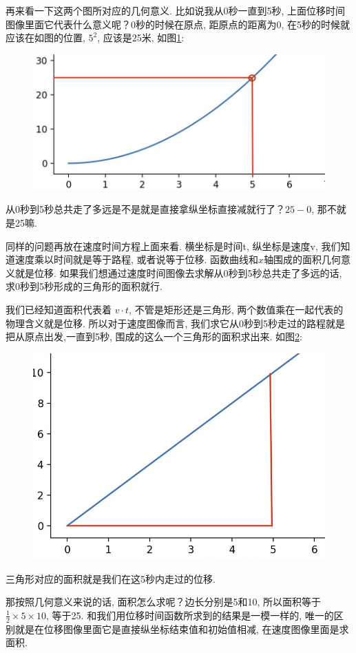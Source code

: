 再来看一下这两个图所对应的几何意义. 比如说我从0秒一直到5秒, 上面位移时间图像里面它代表什么意义呢？0秒的时候在原点, 距原点的距离为0, 在5秒的时候就应该在如图的位置, $5^2$, 应该是25米, 如图\ref{fig:img14_3}: 

\begin{figure}[ht]
  \centering
  \caption{}
  \label{fig:img14_3}
  \includegraphics[width=0.5\linewidth]{asset/20230904131050.png}
\end{figure}

从0秒到5秒总共走了多远是不是就是直接拿纵坐标直接减就行了？$25-0$, 那不就是25嘛. 

同样的问题再放在速度时间方程上面来看. 横坐标是时间t, 纵坐标是速度v, 我们知道速度乘以时间就是等于路程, 或者说等于位移. 函数曲线和$x$轴围成的面积几何意义就是位移. 如果我们想通过速度时间图像去求解从0秒到5秒总共走了多远的话, 求0秒到5秒形成的三角形的面积就行. 

我们已经知道面积代表着 $v\cdot t$, 不管是矩形还是三角形, 两个数值乘在一起代表的物理含义就是位移. 所以对于速度图像而言, 我们求它从0秒到5秒走过的路程就是把从原点出发,一直到5秒, 围成的这么一个三角形的面积求出来. 如图\ref{fig:img14_4}: 

\begin{figure}[ht]
  \centering
  \includegraphics[width=0.5\linewidth]{asset/20230904131921.png}
  \caption{}
  \label{fig:img14_4}
\end{figure}

三角形对应的面积就是我们在这5秒内走过的位移. 

那按照几何意义来说的话, 面积怎么求呢？边长分别是5和10, 所以面积等于$\frac{1}{2} \times 5 \times 10$, 等于25. 和我们用位移时间函数所求到的结果是一模一样的, 唯一的区别就是在位移图像里面它是直接纵坐标结束值和初始值相减, 在速度图像里面是求面积. 

